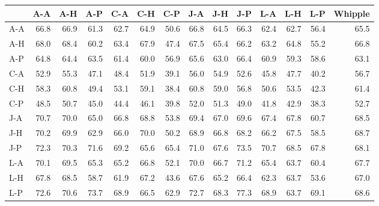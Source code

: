 \begin{tabular}{lrrrrrrrrrrrrr}
\toprule
{} &  A-A &  A-H &  A-P &  C-A &  C-H &  C-P &  J-A &  J-H &  J-P &  L-A &  L-H &  L-P &  Whipple \\
\midrule
A-A & 66.8 & 66.9 & 61.3 & 62.7 & 64.9 & 50.6 & 66.8 & 64.5 & 66.3 & 62.4 & 62.7 & 56.4 &     65.5 \\
A-H & 68.0 & 68.4 & 60.2 & 63.4 & 67.9 & 47.4 & 67.5 & 65.4 & 66.2 & 63.2 & 64.8 & 55.2 &     66.8 \\
A-P & 64.8 & 64.4 & 63.5 & 61.4 & 60.0 & 56.9 & 65.6 & 63.0 & 66.4 & 60.9 & 59.3 & 58.6 &     63.1 \\
C-A & 52.9 & 55.3 & 47.1 & 48.4 & 51.9 & 39.1 & 56.0 & 54.9 & 52.6 & 45.8 & 47.7 & 40.2 &     56.7 \\
C-H & 58.3 & 60.8 & 49.4 & 53.1 & 59.1 & 38.4 & 60.8 & 59.0 & 56.8 & 50.6 & 53.5 & 42.3 &     61.4 \\
C-P & 48.5 & 50.7 & 45.0 & 44.4 & 46.1 & 39.8 & 52.0 & 51.3 & 49.0 & 41.8 & 42.9 & 38.3 &     52.7 \\
J-A & 70.7 & 70.0 & 65.0 & 66.8 & 68.8 & 53.8 & 69.4 & 67.0 & 69.6 & 67.4 & 67.8 & 60.7 &     68.5 \\
J-H & 70.2 & 69.9 & 62.9 & 66.0 & 70.0 & 50.2 & 68.9 & 66.8 & 68.2 & 66.2 & 67.5 & 58.5 &     68.7 \\
J-P & 72.3 & 70.3 & 71.6 & 69.2 & 65.6 & 65.4 & 71.0 & 67.6 & 73.5 & 70.7 & 68.5 & 67.8 &     68.1 \\
L-A & 70.1 & 69.5 & 65.3 & 65.2 & 66.8 & 52.1 & 70.0 & 66.7 & 71.2 & 65.4 & 63.7 & 60.4 &     67.7 \\
L-H & 67.8 & 68.5 & 58.7 & 61.9 & 67.2 & 43.6 & 67.6 & 65.2 & 66.4 & 62.3 & 63.7 & 53.6 &     67.0 \\
L-P & 72.6 & 70.6 & 73.7 & 68.9 & 66.5 & 62.9 & 72.7 & 68.3 & 77.3 & 68.9 & 63.7 & 69.1 &     68.6 \\
\bottomrule
\end{tabular}
